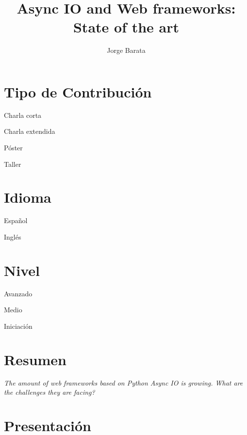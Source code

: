 \documentclass[runningheads]{llncs}
\newcommand{\cmark}{\ding{51}}%
\newcommand{\done}{\rlap{$\square$}{\raisebox{2pt}{\large\hspace{1pt}\cmark}}%
\hspace{-2.5pt}}
\begin{document}
\pagestyle{headings}
\mainmatter


\title{Async IO and Web frameworks: State of the art}


\author{Jorge Barata}

\maketitle

\section{Tipo de Contribuci\'on}

\begin{todolist}
  \item Charla corta
  \item [\done] Charla extendida
  \item P\'oster
  \item Taller
  \end{todolist}


\section{Idioma}
\begin{todolist}
  \item Espa\~nol
  \item [\done] Ingl\'es
\end{todolist}
\section{Nivel}

\begin{todolist}
  \item [\done] Avanzado
  \item Medio
  \item Iniciaci\'on
  \end{todolist}


\newpage

\section{Resumen}
\textit{
The amount of web frameworks based on Python Async IO is growing. What are the challenges they are facing?
}

\section{Presentaci\'on}
\end{document}
